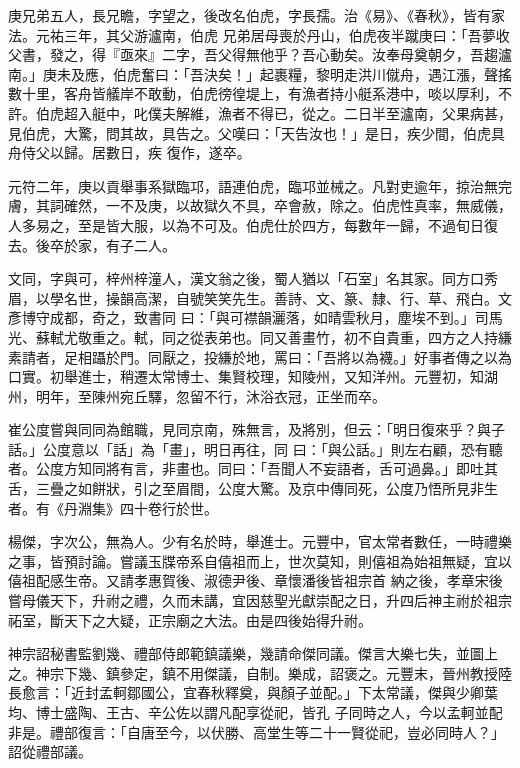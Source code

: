 \begin{pinyinscope}
 庚兄弟五人，長兄瞻，字望之，後改名伯虎，字長孺。治《易》、《春秋》，皆有家法。元祐三年，其父游瀘南，伯虎
 兄弟居母喪於丹山，伯虎夜半蹴庚曰：「吾夢收父書，發之，得『亟來』二字，吾父得無他乎？吾心動矣。汝奉母奠朝夕，吾趨瀘南。」庚未及應，伯虎奮曰：「吾決矣！」起裹糧，黎明走洪川僦舟，遇江漲，聲搖數十里，客舟皆艤岸不敢動，伯虎徬徨堤上，有漁者持小艇系港中，啖以厚利，不許。伯虎超入艇中，叱僕夫解維，漁者不得已，從之。二日半至瀘南，父果病甚，見伯虎，大驚，問其故，具告之。父嘆曰：「天告汝也！」是日，疾少間，伯虎具舟侍父以歸。居數日，疾
 復作，遂卒。



 元符二年，庚以貢舉事系獄臨邛，語連伯虎，臨邛並械之。凡對吏逾年，掠治無完膚，其詞確然，一不及庚，以故獄久不具，卒會赦，除之。伯虎性真率，無威儀，人多易之，至是皆大服，以為不可及。伯虎仕於四方，每數年一歸，不過旬日復去。後卒於家，有子二人。



 文同，字與可，梓州梓潼人，漢文翁之後，蜀人猶以「石室」名其家。同方口秀眉，以學名世，操韻高潔，自號笑笑先生。善詩、文、篆、隸、行、草、飛白。文彥博守成都，奇之，致書同
 曰：「與可襟韻灑落，如晴雲秋月，塵埃不到。」司馬光、蘇軾尤敬重之。軾，同之從表弟也。同又善畫竹，初不自貴重，四方之人持縑素請者，足相躡於門。同厭之，投縑於地，罵曰：「吾將以為襪。」好事者傳之以為口實。初舉進士，稍遷太常博士、集賢校理，知陵州，又知洋州。元豐初，知湖州，明年，至陳州宛丘驛，忽留不行，沐浴衣冠，正坐而卒。



 崔公度嘗與同同為館職，見同京南，殊無言，及將別，但云：「明日復來乎？與子話。」公度意以「話」為「畫」，明日再往，同
 曰：「與公話。」則左右顧，恐有聽者。公度方知同將有言，非畫也。同曰：「吾聞人不妄語者，舌可過鼻。」即吐其舌，三疊之如餅狀，引之至眉間，公度大驚。及京中傳同死，公度乃悟所見非生者。有《丹淵集》四十卷行於世。



 楊傑，字次公，無為人。少有名於時，舉進士。元豐中，官太常者數任，一時禮樂之事，皆預討論。嘗議玉牒帝系自僖祖而上，世次莫知，則僖祖為始祖無疑，宜以僖祖配感生帝。又請孝惠賀後、淑德尹後、章懷潘後皆祖宗首
 納之後，孝章宋後嘗母儀天下，升祔之禮，久而未講，宜因慈聖光獻崇配之日，升四后神主祔於祖宗祏室，斷天下之大疑，正宗廟之大法。由是四後始得升祔。



 神宗詔秘書監劉幾、禮部侍郎範鎮議樂，幾請命傑同議。傑言大樂七失，並圖上之。神宗下幾、鎮參定，鎮不用傑議，自制。樂成，詔褒之。元豐末，晉州教授陸長愈言：「近封孟軻鄒國公，宜春秋釋奠，與顏子並配。」下太常議，傑與少卿葉均、博士盛陶、王古、辛公佐以謂凡配享從祀，皆孔
 子同時之人，今以孟軻並配非是。禮部復言：「自唐至今，以伏勝、高堂生等二十一賢從祀，豈必同時人？」詔從禮部議。




\end{pinyinscope}
